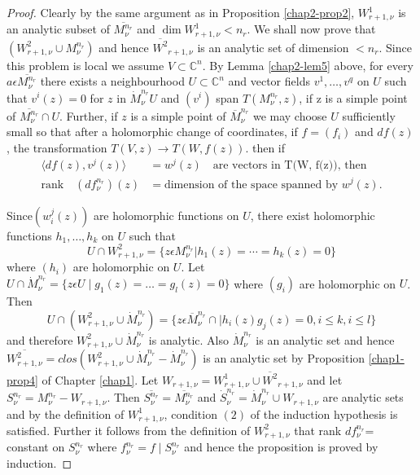 \begin{proof}
Clearly by the same argument as in Proposition \ref{chap2-prop2},
$W^1_{r+1,\nu}$ is 
an analytic subset of $\overline{M_\nu^{n_r}}$ and $\dim W^1_{r+1,\nu}
< n_r$. We shall now prove that $(W^2_{r+1,\nu}\cup M^{n_r}_\nu)$ and
hence $\overline{W^2}_{r+1,\nu}$ is an analytic set of dimension $<
n_r$. Since this problem is local we assume $V \subset
\mathbb{C}^n$. By Lemma \ref{chap2-lem5} above, for every $a \epsilon
\overline{M_\nu^{n_r}}$ there exists a neighbourhood $U \subset
\mathbb{C}^n$ and vector fields $v^1,\ldots,v^q$ on $U$ such that
$v^i(z) = 0$ for $z$ in $\dot{M}_\nu^{n_r} U$ and $(v^i)$ span
$T(M_\nu^{n_r}, z)$, if z is a simple point of $\overline{M_\nu^{n_r}}
\cap U$. Further, if $z$ is a simple point of $\overline{M}_\nu^{n_r}$
we may choose $U$ sufficiently small so that after a holomorphic
change of coordinates, if $f = (f_i)$ and $df (z)$, the transformation
$T(V,z)\rightarrow T(W,f(z))$. then if  
\begin{align*}
  \langle df (z), v^j(z) \rangle & = w^j (z)\quad \text{are vectors in T(W,
    f(z)), then}\\ 
  \text{rank} \quad(df_\nu^{n_r})(z) & = \text{dimension of the space
    spanned by } w^{j}(z). 
\end{align*}

Since\pageoriginale $(w^j_i(z))$ are holomorphic functions on $U$, there exist
holomorphic functions $h_1,\ldots, h_k$ on $U$ such that  
$$
U \cap W^2_{r+1,\nu} = \bigg\{z \epsilon M_\nu^{n_r}\big| h_1(z)=
\cdots = h_k(z) = 0\bigg\} 
$$
where $(h_i)$ are holomorphic on $U$. Let $U \cap \dot{M}_\nu^{n_r} =
\bigg\{z \epsilon U \mid g_1 (z)=\ldots = g_l(z) = 0\bigg\}$ where
$(g_i)$ are holomorphic on $U$. Then  
$$
U \cap (W^2_{r+1,\nu} \cup \dot{M}_\nu^{n_r}) =\bigg\{z \epsilon
\overline{M}_\nu^{n_r}\cap \big| h_i(z) g_j(z)=0, i \leq k,i \leq l
\bigg\} 
$$
 and therefore $W^2_{r+1,\nu}\cup \dot{M}_\nu^{n_r}$ is analytic. Also
 $\dot{M}_\nu^{n_r}$ is an analytic set and hence
 $\overline{W^2_{r+1,\nu}}= clos (W^2_{r+1,\nu}\cup \dot{M}^{n_r}_\nu
 -\dot{M}^{n_r}_\nu)$ is an analytic set by Proposition
 \ref{chap1-prop4} of Chapter 
 \ref{chap1}. Let $W_{r+1,\nu}=W^1_{r+1,\nu}\cup \overline{W^2}_{r+1,\nu}$ and
 let $S^{n_r}_\nu =M^{n_r}_\nu - W_{r+1,\nu}$. Then
 $\overline{S^{n_r}_\nu} = \overline{M^{n_r}_\nu}$ and
 $\dot{S}_\nu^{n_r} = \dot{M}_\nu^{n_r} \cup W_{r+1,\nu}$ are analytic
 sets and by the definition of $W^1_{r+1,\nu}$, condition $(2)$ of the
 induction hypothesis is satisfied. Further it follows from the
 definition of $W^2_{r+1,\nu}$ that rank $df_\nu^{n_r}$= constant on
 $S_\nu^{n_r}$ where $f^{n_r}_\nu = f\mid S^{n_r}_\nu$ and hence the
 proposition is proved by induction. 
\end{proof}

